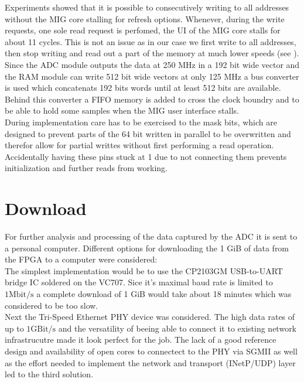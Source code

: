 Experiments showed that it is possible to consecutively writing to all
addresses without the \gls{MIG} core stalling for refresh options.
Whenever, during the write requests, one sole read request
is perfomed, the \gls{UI} of the \gls{MIG} core stalls for about 11
cycles. This is not an issue as in our case we first write
to all addresses, then stop writing and read out a part of the memory
at much lower speeds (see ). \\

Since the \gls{ADC} module outputs the data at 250 MHz in a 192 bit
wide vector and the \gls{RAM} module can write 512 bit wide vectors
at only 125 MHz a bus converter is used which concatenats 192 bits
words until at least 512 bits are available. Behind this converter
a \gls{FIFO} memory is added to cross the clock boundry and to be able
to hold some samples when the \gls{MIG} user interface stalls. \\

During implementation care has to be exercised to the mask bits,
which are designed to prevent parts of the 64 bit written in parallel to be
overwritten and therefor allow for partial writtes without first performing
a read operation. Accidentally having these pins stuck at 1 due to
not connecting them prevents initialization and further reads from
working. \\

\section{Download}
\label{sec:fpga_download}
For further analysis and processing of the data captured by the \gls{ADC}
it is sent to a personal computer.
Different options for downloading the 1 GiB of data from the \gls{FPGA}
to a computer were considered: \\

The simplest implementation would be to use the CP2103GM USB-to-UART
bridge IC soldered on the VC707. Sice it's maximal baud rate is limited to
$1 \text{Mbit}/\text{s}$ a complete download of 1 GiB would take about
18 minutes which was considered to be too slow. \\

Next the Tri-Speed Ethernet \acrshort{PHY} device was considered.
The high data rates of up to $1 \text{GBit}/\text{s}$ and the versatility
of beeing able to connect it to existing network infrastrucutre made
it look perfect for the job. The lack of a good reference design and
availability of open cores to connectect to the \gls{PHY} via
\acrshort{SGMII} as well as the effort needed to implement
the network and transport (\acrshort{INetP}/\acrshort{UDP}) layer
led to the third solution. \\

